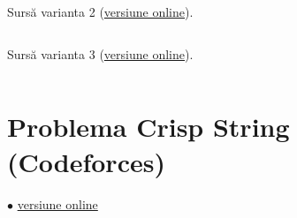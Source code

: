 \documentclass[../main.tex]{subfiles}
\begin{document}
Sursă varianta 2 (\href{https://codeforces.com/contest/827/submission/291042903}{versiune online}).

\inputminted{cpp}{../src/bit-mastery/dna-evolution-2.cpp}

Sursă varianta 3 (\href{https://codeforces.com/contest/827/submission/291046655}{versiune online}).

\inputminted{cpp}{../src/bit-mastery/dna-evolution-3.cpp}

\section{Problema Crisp String (Codeforces)}
\label{code:crisp-string}
$\bullet$
\href{https://codeforces.com/contest/1117/submission/291150735}{versiune online}

\inputminted{cpp}{../src/bit-mastery/crisp-string.cpp}
\end{document}
